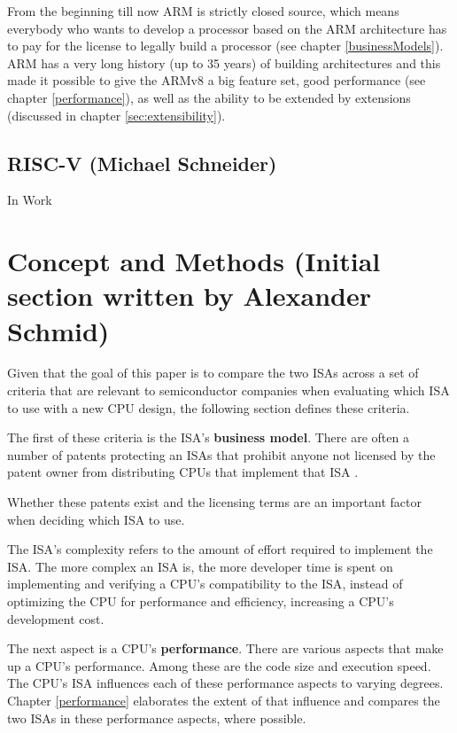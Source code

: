 \documentclass[conference]{IEEEtran}
\begin{document}
	From the beginning till now ARM is strictly closed source, which means everybody who wants to develop a processor based on the ARM architecture has to pay for the license to legally build a processor (see chapter \ref{businessModels}). ARM has a very long history (up to 35 years) of building architectures and this made it possible to give the ARMv8 a big feature set, good performance (see chapter \ref{performance}), as well as the ability to be extended by extensions (discussed in chapter \ref{sec:extensibility}).
	
	\subsection{RISC-V (Michael Schneider)}
	In Work	

\section{Concept and Methods (Initial section written by Alexander Schmid)}
\label{ref:concept}

Given that the goal of this paper is to compare the two \glspl{ISA}
across a set of criteria that are relevant to semiconductor companies when evaluating which \gls{ISA} to use with a new CPU design,
the following section defines these criteria.

The first of these criteria is the \gls{ISA}'s \textbf{business model}. There are often a number of patents protecting an \glspl{ISA} that prohibit anyone not licensed
by the patent owner from distributing \glspl{CPU} that implement that \gls{ISA} \cite{Tang2011}.

Whether these patents exist and the licensing terms
are an important factor when deciding which \gls{ISA} to use.

The \gls{ISA}'s complexity refers to the amount of effort required to implement the \gls{ISA}. The more complex an \gls{ISA} is, the more developer
time is spent on implementing and verifying a \gls{CPU}'s compatibility to the \gls{ISA}, instead of optimizing the \gls{CPU} for performance and efficiency,
increasing a \gls{CPU}'s development cost. \cite{Patterson1980}

The next aspect is a \gls{CPU}'s \textbf{performance}. There are various aspects that make up a \gls{CPU}'s performance.
Among these are the code size and execution speed.
The \gls{CPU}'s \gls{ISA} influences each of these performance aspects to varying degrees. Chapter \ref{performance} elaborates
the extent of that influence and compares the two \glspl{ISA} in these performance aspects, where possible.
\end{document}
